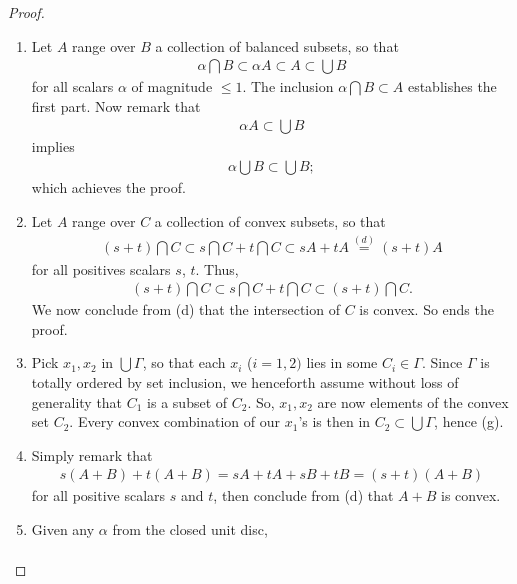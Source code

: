 \begin{proof}
\begin{enumerate}
\begin{align}
  0A + A \overset{(b)}{=}\{0\}+A=A.
\end{align}
%
The extension to $s=1$ is analogously established %
(or simply use the fact that $+$ is commutative!).
So ends the proof. %
\item Let $A$ range over $B$ a collection of balanced subsets, so that %
%
\begin{align}
  \alpha \bigcap B \subset  \alpha A \subset A \subset \bigcup B 
\end{align}
%
for all scalars $\alpha$ of magnitude $\leq 1$. %
The inclusion $\alpha \bigcap B \subset A$ establishes the first part. %
Now remark that %
%
\begin{align}
  \alpha A  \subset \bigcup {B} 
\end{align}
%
implies %
%
\begin{align}
  \alpha \bigcup {B} \subset \bigcup {B};
\end{align}
which achieves the proof. %
%
\item Let $A$ range over $C$ a collection of convex subsets, so that %
%
\begin{align}
  (s+t) \bigcap C \subset s\bigcap C + t\bigcap C \subset  sA + tA 
  \overset{(d)}{=} (s+t)A
\end{align}
%
for all positives scalars $\mathit{s}$, $\mathit{t}$. Thus, %
%
\begin{align}
  (s+t) \bigcap C \subset s\bigcap C  + t \bigcap C  \subset (s+t) \bigcap C.
\end{align}
%
We now conclude from (d) that the intersection of $C$ is convex. %
So ends the proof.
\item Pick $x_1, x_2$ in $\bigcup \Gamma$, 
so that each $x_i$ ($i=1, 2)$ lies in some $C_i \in \Gamma$. %
%
Since $\Gamma$ is totally ordered by set inclusion, we henceforth assume %
without loss of generality that $C_1$ is a subset of $C_2$. %
%
So, $x_1, x_2$ are now elements of the convex set $C_2$. %
Every convex combination of our $x_1$'s is then in %
$C_2 \subset \bigcup \Gamma $, hence (g). %
\item Simply remark that 
%
\begin{align}
  s (A+B) + t (A+B) = s A+ t A +s B +t B = (s+t)(A+B)
\end{align}
%
for all positive scalars $\mathit{s}$ and $\mathit{t}$, %
then conclude from (d) that $A + B$ is convex. %
\item Given any $\alpha$ from the closed unit disc, %
%
\begin{align}

\end{align}
\end{enumerate}
\end{proof}
